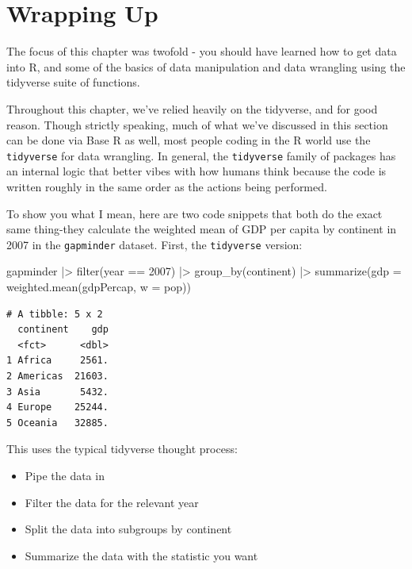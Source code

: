 \documentclass[
  letterpaper,
]{book}
\newenvironment{Shaded}{\begin{snugshade}}{\end{snugshade}}
\newcommand{\AttributeTok}[1]{\textcolor[rgb]{0.40,0.45,0.13}{#1}}
\newcommand{\DecValTok}[1]{\textcolor[rgb]{0.68,0.00,0.00}{#1}}
\newcommand{\FunctionTok}[1]{\textcolor[rgb]{0.28,0.35,0.67}{#1}}
\newcommand{\NormalTok}[1]{\textcolor[rgb]{0.00,0.23,0.31}{#1}}
\newcommand{\SpecialCharTok}[1]{\textcolor[rgb]{0.37,0.37,0.37}{#1}}
\providecommand{\tightlist}{%
  \setlength{\itemsep}{0pt}\setlength{\parskip}{0pt}}\usepackage{longtable,booktabs,array}
\begin{document}
\section{Wrapping Up}\label{wrapping-up-1}

The focus of this chapter was twofold - you should have learned how to
get data into R, and some of the basics of data manipulation and data
wrangling using the tidyverse suite of functions.

Throughout this chapter, we've relied heavily on the tidyverse, and for
good reason. Though strictly speaking, much of what we've discussed in
this section can be done via Base R as well, most people coding in the R
world use the \texttt{tidyverse} for data wrangling. In general, the
\texttt{tidyverse} family of packages has an internal logic that better
vibes with how humans think because the code is written roughly in the
same order as the actions being performed.

To show you what I mean, here are two code snippets that both do the
exact same thing-they calculate the weighted mean of GDP per capita by
continent in 2007 in the \texttt{gapminder} dataset. First, the
\texttt{tidyverse} version:

\begin{Shaded}
\begin{Highlighting}[]
\NormalTok{gapminder }\SpecialCharTok{|\textgreater{}} 
  \FunctionTok{filter}\NormalTok{(year }\SpecialCharTok{==} \DecValTok{2007}\NormalTok{) }\SpecialCharTok{|\textgreater{}} 
  \FunctionTok{group\_by}\NormalTok{(continent) }\SpecialCharTok{|\textgreater{}} 
  \FunctionTok{summarize}\NormalTok{(}\AttributeTok{gdp =} \FunctionTok{weighted.mean}\NormalTok{(gdpPercap, }\AttributeTok{w =}\NormalTok{ pop))   }
\end{Highlighting}
\end{Shaded}

\begin{verbatim}
# A tibble: 5 x 2
  continent    gdp
  <fct>      <dbl>
1 Africa     2561.
2 Americas  21603.
3 Asia       5432.
4 Europe    25244.
5 Oceania   32885.
\end{verbatim}

This uses the typical tidyverse thought process:

\begin{itemize}
\tightlist
\item
  Pipe the data in
\item
  Filter the data for the relevant year
\item
  Split the data into subgroups by continent
\item
  Summarize the data with the statistic you want
\end{itemize}
\end{document}

